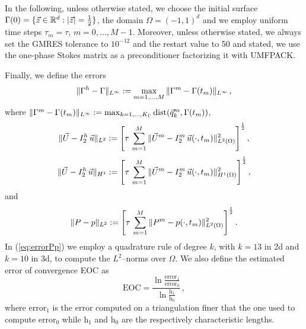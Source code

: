 In the following, unless otherwise stated, we choose the initial surface
$\Gamma(0) = \{ \vec z \in {\mathbb R}^d : |\vec z| = \frac12 \}$, the domain
$\Omega = (-1,1)^d$ and we employ uniform time steps $\tau_m=\tau$,
$m=0,\ldots, M-1$. Moreover, unless otherwise stated, we always set the GMRES
tolerance to $10^{-12}$ and the restart value to 50 and stated, we use the
one-phase Stokes matrix as a preconditioner factorizing it with UMFPACK.

Finally, we define the errors
\begin{equation} \label{eq:errorXx}
\|\Gamma^h - \Gamma\|_{L^\infty} := \max_{m=1,\ldots, M} \|\Gamma^m - \Gamma(t_m)\|_{L^\infty}\,,
\end{equation}
where $\|\Gamma^m - \Gamma(t_m)\|_{L^\infty} :=
\max_{k=1,\ldots, K_\Gamma} {\rm dist}( \vec{q}^m_k, \Gamma(t_m))$,
\begin{equation} \label{eq:errorLUu}
\|\vec U - I^h_{2}\,\vec u\|_{L^2} := \left[\tau\,\sum_{m=1}^M \|\vec U^m - I^m_2\,\vec u(\cdot,
t_m)\|_{L^2(\Omega)}^2 \right]^\frac12,
\end{equation}
\begin{equation} \label{eq:errorHUu}
\|\vec U - I^h_{2}\,\vec u\|_{H^1} := \left[\tau\,\sum_{m=1}^M \|\vec U^m - I^m_2\,\vec u(\cdot,
t_m)\|_{H^1(\Omega)}^2 \right]^\frac12,
\end{equation}
and
\begin{equation} \label{eq:errorPp}
\|P - p\|_{L^2} := \left[\tau\,\sum_{m=1}^M \|P^m - p(\cdot,t_m)\|_{L^2(\Omega)}^2
\right]^\frac12.
\end{equation}
In (\ref{eq:errorPp}) we employ a quadrature rule of degree $k$, with $k=13$ in
2d and $k=10$ in 3d, to compute the $L^2$--norms over $\Omega$. We also define
the estimated error of convergence EOC as
\begin{equation} \label{eq:eoc}
\mbox{EOC}=\frac{\ln{\frac{\mbox{error}_1}{\mbox{error}_0}}}
{\ln{\frac{\mbox{h}_1}{\mbox{h}_0}}}\,,
\end{equation}
where $\mbox{error}_1$ is the error computed on a triangulation finer that the
one used to compute $\mbox{error}_0$ while $\mbox{h}_1$ and $\mbox{h}_0$ are the
respectively characteristic lengths.

